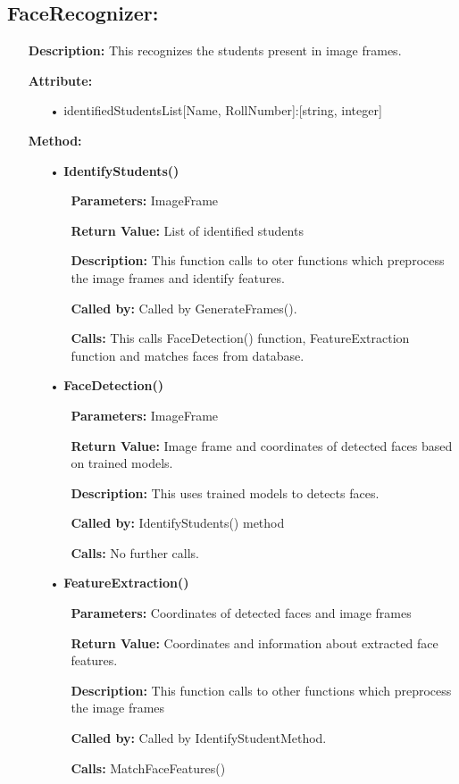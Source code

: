 \documentclass{scrreprt}
\begin{document}
\subsection{FaceRecognizer:}
\begin{enumerate}
\item[] \textbf{Description:} This recognizes the students present in image frames. 
\item[] \textbf{Attribute:}
\begin{itemize}
\item [•] identifiedStudentsList[Name, RollNumber]:[string, integer]
\end{itemize}
\item[] \textbf{Method:}
\begin{itemize}	
\item [•] \textbf{IdentifyStudents()}
\begin{itemize}
\item [] \textbf{Parameters:} ImageFrame
\item [] \textbf{Return Value:} List of identified students
\item [] \textbf{Description:} This function calls to oter functions which preprocess the image frames and identify features.
\item [] \textbf{Called by:} Called by GenerateFrames().
\item [] \textbf{Calls:} This calls FaceDetection() function, FeatureExtraction function and matches faces from database.
\end{itemize}

\item [•] \textbf{FaceDetection()}
\begin{itemize}
\item [] \textbf{Parameters:} ImageFrame
\item [] \textbf{Return Value:} Image frame and coordinates of detected faces based on trained models. 
\item [] \textbf{Description:} This uses trained models to detects faces.
\item [] \textbf{Called by:} IdentifyStudents() method
\item [] \textbf{Calls:} No further calls.
\end{itemize}

\item [•] \textbf{FeatureExtraction()}
\begin{itemize}
\item [] \textbf{Parameters:} Coordinates of detected faces and image frames
\item [] \textbf{Return Value:} Coordinates and information about extracted face features.
\item [] \textbf{Description:} This function calls to other functions which preprocess the image frames 
\item [] \textbf{Called by:} Called by IdentifyStudentMethod.
\item [] \textbf{Calls:} MatchFaceFeatures()
\end{itemize}
\end{itemize}
\end{enumerate}
\end{document}
